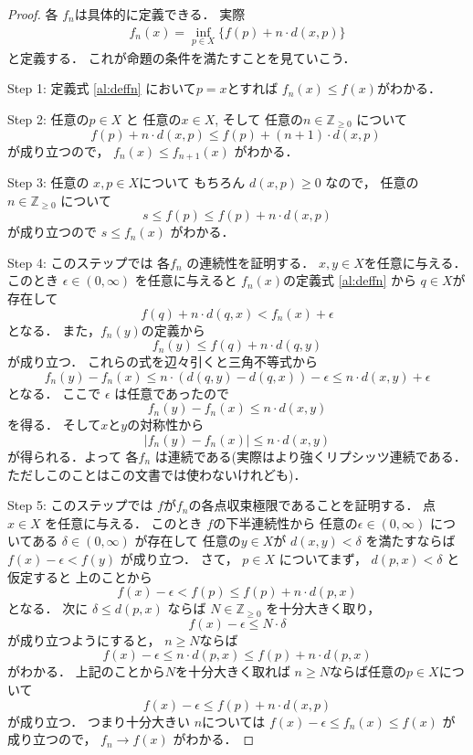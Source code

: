 \documentclass[leqno, a4paper, 12pt, dvipdfmx]{jsarticle}
\newcommand{\zz}{\mathbb{Z}}
\begin{document}
\begin{proof}
各
$f_{n}$は具体的に定義できる．
実際
\begin{align}
f_{n}(x)=\inf_{p\in X}\{f(p)+n\cdot d(x, p)\}\tag{D1}\label{al:deffn}
\end{align}
と定義する．
これが命題の条件を満たすことを見ていこう．

Step 1: 
定義式
\eqref{al:deffn}
において$p=x$とすれば
$f_{n}(x)\le f(x)$がわかる．

Step 2: 
任意の$p\in X$
と
任意の$x\in X$, 
そして
任意の$n\in\zz_{\ge 0}$
について
\[
f(p)+n\cdot d(x, p)\le 
f(p)+(n+1)\cdot d(x, p)\
\]
が成り立つので，
$f_{n}(x)\le f_{n+1}(x)$
がわかる．

Step 3: 
任意の
$x, p\in X$について
もちろん
$d(x, p)\ge 0$
なので，
任意の$n\in \zz_{\ge 0}$
について
\[
s\le f(p)\le f(p)+n\cdot d(x, p)
\]
が成り立つので
$s\le f_{n}(x)$
がわかる．

Step 4: このステップでは
各$f_{n}$
の連続性を証明する．
$x, y\in X$を任意に与える．
このとき
$\epsilon\in (0, \infty)$
を任意に与えると
$f_{n}(x)$の定義式
\eqref{al:deffn}
から
$q\in X$が存在して
\[
f(q)+n\cdot d(q, x)<f_{n}(x)+\epsilon
\]
となる．
また，$f_{n}(y)$の定義から
\[
f_{n}(y)\le f(q)+n\cdot d(q, y)
\]
が成り立つ．
これらの式を辺々引くと三角不等式から
\[
f_{n}(y)-f_{n}(x)\le 
n\cdot (d(q, y)-d(q, x))-\epsilon
\le n\cdot d(x, y)+\epsilon
\]
となる．
ここで
$\epsilon$
は任意であったので
\[
f_{n}(y)-f_{n}(x)\le n\cdot d(x, y)
\]
を得る．
そして$x$と$y$の対称性から
\[
|f_{n}(y)-f_{n}(x)|\le n\cdot d(x, y)
\]
が得られる．よって
各$f_{n}$
は連続である(実際はより強くリプシッツ連続である．ただしこのことはこの文書では使わないけれども)．

Step 5: このステップでは
$f$が$f_{n}$の各点収束極限であることを証明する．
点$x\in X$
を任意に与える．
このとき
$f$の下半連続性から
任意の$\epsilon\in (0, \infty)$
についてある
$\delta\in (0, \infty)$
が存在して
任意の$y\in X$が
$d(x, y)<\delta$
を満たすならば
$f(x)-\epsilon<f(y)$
が成り立つ．
さて，
$p\in X$
についてまず，
$d(p, x)<\delta$
と仮定すると
上のことから
\[
f(x)-\epsilon
<f(p)
\le 
f(p)+n\cdot d(p, x)
\]
となる．
次に
$\delta\le d(p, x)$
ならば
$N\in \zz_{\ge 0}$
を十分大きく取り，
\[
f(x)-\epsilon\le N\cdot \delta
\]
が成り立つようにすると，
$n\ge N$ならば
\[
f(x)-\epsilon
\le n\cdot d(p, x)
\le f(p)+n\cdot d(p, x)
\]
がわかる．
上記のことから$N$を十分大きく取れば
$n\ge N$ならば任意の$p\in X$について
\[
f(x)-\epsilon\le 
f(p)+n\cdot d(x, p)
\]
が成り立つ．
つまり十分大きい
$n$については
$f(x)-\epsilon\le f_{n}(x)\le f(x)$
が成り立つので，
$f_{n}\to f(x)$
がわかる．
\end{proof}
\end{document}
